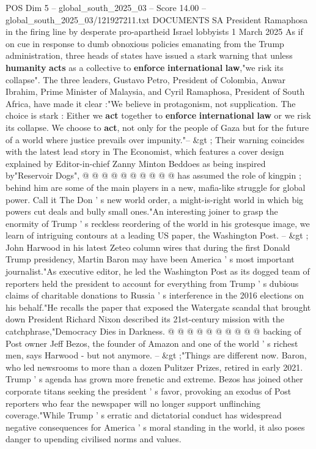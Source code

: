 \begin{textsample}{POS Dim 5 – global\_south\_2025\_03 – Score 14.00 – global\_south\_2025\_03/121927211.txt}  \label{ex:f5_pos_185}
DOCUMENTS SA President Ramaphosa in the firing line by desperate pro-apartheid Israel lobbyists 1 March 2025 As if on cue in response to dumb obnoxious policies emanating from the Trump administration, three heads of states have issued a stark warning that unless \textbf{humanity} \textbf{acts} as a collective to \textbf{enforce} \textbf{international} \textbf{law},"we risk its collapse".
The three leaders, Gustavo Petro, President of Colombia, Anwar Ibrahim, Prime Minister of Malaysia, and Cyril Ramaphosa, President of South Africa, have made it clear :"We believe in protagonism, not supplication.
The choice is stark : Either we \textbf{act} together to \textbf{enforce} \textbf{international} \textbf{law} or we risk its collapse.
We choose to \textbf{act}, not only for the people of Gaza but for the future of a world where justice prevails over impunity."-- \&gt ; Their warning coincides with the latest lead story in The Economist, which features a cover design explained by Editor-in-chief Zanny Minton Beddoes as being inspired by"Reservoir Dogs", @ @ @ @ @ @ @ @ @ @ has assumed the role of kingpin ; behind him are some of the main players in a new, mafia-like struggle for global power.
Call it The Don ' s new world order, a might-is-right world in which big powers cut deals and bully small ones."An interesting joiner to grasp the enormity of Trump ' s reckless reordering of the world in his grotesque image, we learn of intriguing contours at a leading US paper, the Washington Post. -- \&gt ; John Harwood in his latest Zeteo column wires that during the first Donald Trump presidency, Martin Baron may have been America ' s most important journalist."As executive editor, he led the Washington Post as its dogged team of reporters held the president to account for everything from Trump ' s dubious claims of charitable donations to Russia ' s interference in the 2016 elections on his behalf."He recalls the paper that exposed the Watergate scandal that brought down President Richard Nixon described its 21st-century mission with the catchphrase,"Democracy Dies in Darkness. @ @ @ @ @ @ @ @ @ @ backing of Post owner Jeff Bezos, the founder of Amazon and one of the world ' s richest men, says Harwood - but not anymore. -- \&gt ;"Things are different now.
Baron, who led newsrooms to more than a dozen Pulitzer Prizes, retired in early 2021.
Trump ' s agenda has grown more frenetic and extreme.
Bezos has joined other corporate titans seeking the president ' s favor, provoking an exodus of Post reporters who fear the newspaper will no longer support unflinching coverage."While Trump ' s erratic and dictatorial conduct has widespread negative consequences for America ' s moral standing in the world, it also poses danger to upending civilised norms and values.

\end{textsample}
